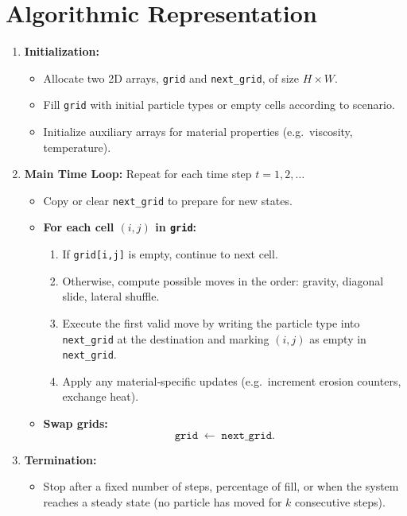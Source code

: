 \documentclass{article}
\begin{document}
\section{Algorithmic Representation}

\begin{enumerate}
  \item \textbf{Initialization:}  
    \begin{itemize}
      \item Allocate two 2D arrays, \texttt{grid} and \texttt{next\_grid}, of size \(H\times W\).
      \item Fill \texttt{grid} with initial particle types or empty cells according to scenario.
      \item Initialize auxiliary arrays for material properties (e.g.\ viscosity, temperature).
    \end{itemize}
  \item \textbf{Main Time Loop:}  Repeat for each time step \(t = 1, 2, \dots\)
    \begin{itemize}
      \item Copy or clear \texttt{next\_grid} to prepare for new states.
      \item \textbf{For each cell \((i,j)\) in \texttt{grid}:}
        \begin{enumerate}
          \item If \texttt{grid[i,j]} is empty, continue to next cell.
          \item Otherwise, compute possible moves in the order: gravity, diagonal slide, lateral shuffle.
          \item Execute the first valid move by writing the particle type into \texttt{next\_grid} at the destination and marking \((i,j)\) as empty in \texttt{next\_grid}.
          \item Apply any material‑specific updates (e.g.\ increment erosion counters, exchange heat).
        \end{enumerate}
      \item \textbf{Swap grids:}  
        \[
          \texttt{grid} \;\longleftarrow\; \texttt{next\_grid}.
        \]

    \end{itemize}
  \item \textbf{Termination:}  
    \begin{itemize}
      \item Stop after a fixed number of steps, percentage of fill, or when the system reaches a steady state (no particle has moved for \(k\) consecutive steps).
    \end{itemize}
\end{enumerate}
\end{document}
